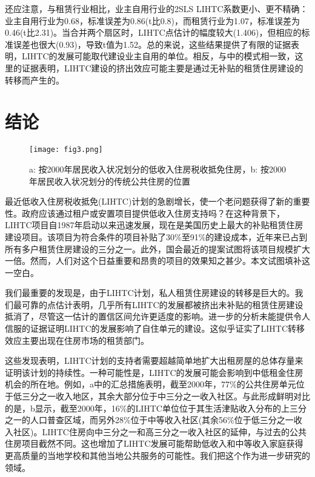 \documentclass[lang=cn,11pt,a4paper]{paper}
\begin{document}
还应注意，与租赁行业相比，业主自用行业的2SLS LIHTC系数更小、更不精确：业主自用行业为0.68，标准误差为0.86(t比0.8)，而租赁行业为1.07，标准误差为0.46(t比2.31)。当合并两个扇区时，LIHTC点估计的幅度较大(1.406)，但相应的标准误差也很大(0.93)，导致t值为1.52。总的来说，这些结果提供了有限的证据表明，LIHTC的发展可能取代建设业主自用的单位。相反，与中的模式相一致，这里的证据表明，LIHTC建设的挤出效应可能主要是通过无补贴的租赁住房建设的转移而产生的。

\section{结论}\label{sec6}

\begin{figure}[t]
	\centering
	\texttt{[image: fig3.png]}
  \caption{a: 按2000年居民收入状况划分的低收入住房税收抵免住房，b: 按2000年居民收入状况划分的传统公共住房的位置}\label{fig3}
\end{figure}

最近低收入住房税收抵免(LIHTC)计划的急剧增长，使一个老问题获得了新的重要性。政府应该通过租户或安置项目提供低收入住房支持吗？在这种背景下，LIHTC项目自1987年启动以来迅速发展，现在是美国历史上最大的补贴租赁住房建设项目。该项目为符合条件的项目补贴了30\%至91\%的建设成本，近年来已占到所有多户租赁住房建设的三分之一。此外，国会最近的提案试图将该项目规模扩大一倍。然而，人们对这个日益重要和昂贵的项目的效果知之甚少。本文试图填补这一空白。

我们最重要的发现是，由于LIHTC计划，私人租赁住房建设的转移是巨大的。我们最可靠的点估计表明，几乎所有LIHTC的发展都被挤出未补贴的租赁住房建设抵消了，尽管这一估计的置信区间允许更适度的影响。进一步的分析未能提供令人信服的证据证明LIHTC的发展影响了自住单元的建设。这似乎证实了LIHTC转移效应主要出现在住房市场的租赁部门。

这些发现表明，LIHTC计划的支持者需要超越简单地扩大出租房屋的总体存量来证明该计划的持续性。一种可能性是，LIHTC的发展可能会影响到中低租金住房机会的所在地。例如，a中的汇总措施表明，截至2000年，77\%的公共住房单元位于低三分之一收入地区，其余大部分位于中三分之一收入社区。与此形成鲜明对比的是，b显示，截至2000年，16\%的LIHTC单位位于其生活津贴收入分布的上三分之一的人口普查区域，而另外28\%位于中等收入社区(其余56\%位于低三分之一收入社区)。LIHTC住房向中三分之一和高三分之一收入社区的延伸，与过去的公共住房项目截然不同。这也增加了LIHTC发展可能帮助低收入和中等收入家庭获得更高质量的当地学校和其他当地公共服务的可能性。我们把这个作为进一步研究的领域。

\appendix
\setcounter{table}{0}
\renewcommand\thetable{A-\arabic{table}}
\end{document}
